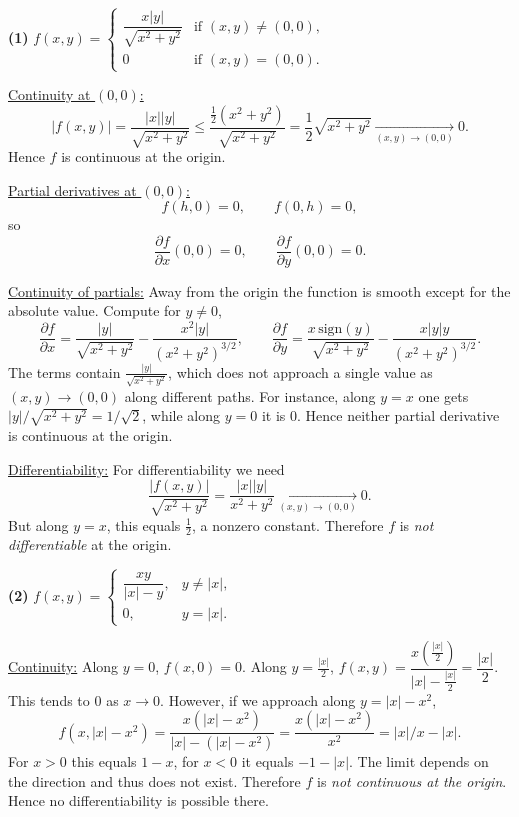 \documentclass[12pt]{article}
\begin{document}
\begin{correctionbox}
\textbf{(1) } $\displaystyle f(x,y)=
\begin{cases}
\dfrac{x|y|}{\sqrt{x^2+y^2}} & \text{if }(x,y)\ne(0,0),\\[0.4em]
0 & \text{if }(x,y)=(0,0).
\end{cases}$

\medskip
\underline{Continuity at $(0,0)$:}
\[
|f(x,y)|=\frac{|x||y|}{\sqrt{x^2+y^2}}
\le \frac{\tfrac{1}{2}(x^2+y^2)}{\sqrt{x^2+y^2}}
=\frac{1}{2}\sqrt{x^2+y^2}\xrightarrow[(x,y)\to(0,0)]{}0.
\]
Hence \(f\) is continuous at the origin.

\medskip
\underline{Partial derivatives at $(0,0)$:}
\[
f(h,0)=0,\qquad f(0,h)=0,
\]
so
\[
\frac{\partial f}{\partial x}(0,0)=0,\qquad \frac{\partial f}{\partial y}(0,0)=0.
\]

\medskip
\underline{Continuity of partials:}
Away from the origin the function is smooth except for the absolute value. Compute for \(y\ne0\),
\[
\frac{\partial f}{\partial x}=\frac{|y|}{\sqrt{x^2+y^2}}-\frac{x^2|y|}{(x^2+y^2)^{3/2}},\qquad
\frac{\partial f}{\partial y}=\frac{x\,\mathrm{sign}(y)}{\sqrt{x^2+y^2}}-\frac{x|y|y}{(x^2+y^2)^{3/2}}.
\]
The terms contain $\frac{|y|}{\sqrt{x^2+y^2}}$, which does not approach a single value as $(x,y)\to(0,0)$ along different paths.  
For instance, along \(y=x\) one gets \(|y|/\sqrt{x^2+y^2}=1/\sqrt{2}\), while along \(y=0\) it is \(0\). Hence neither partial derivative is continuous at the origin.

\medskip
\underline{Differentiability:}
For differentiability we need
\[
\frac{|f(x,y)|}{\sqrt{x^2+y^2}}
=\frac{|x||y|}{x^2+y^2}\xrightarrow[(x,y)\to(0,0)]{}0.
\]
But along \(y=x\), this equals \(\tfrac{1}{2}\), a nonzero constant. Therefore \(f\) is \emph{not differentiable} at the origin.

\bigskip

\textbf{(2) } $\displaystyle f(x,y)=
\begin{cases}
\dfrac{xy}{|x|-y}, & y\ne|x|,\\[0.4em]
0, & y=|x|.
\end{cases}$

\medskip
\underline{Continuity:}
Along \(y=0\), \(f(x,0)=0\).  
Along \(y=\tfrac{|x|}{2}\), \(f(x,y)=\dfrac{x(\tfrac{|x|}{2})}{|x|-\tfrac{|x|}{2}}=\dfrac{|x|}{2}\).  
This tends to \(0\) as \(x\to0\). However, if we approach along \(y=|x|-x^2\),
\[
f(x,|x|-x^2)=\frac{x(|x|-x^2)}{|x|-(|x|-x^2)}=\frac{x(|x|-x^2)}{x^2}=|x|/x - |x|.
\]
For $x>0$ this equals $1-x$, for $x<0$ it equals $-1-|x|$. The limit depends on the direction and thus does not exist.  
Therefore \(f\) is \emph{not continuous at the origin}. Hence no differentiability is possible there.


\end{correctionbox}
\end{document}
